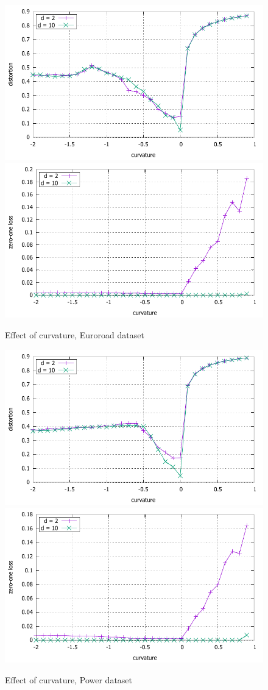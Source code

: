 \documentclass{article} %
\begin{document}
\begin{figure}
    \centering
    \includegraphics[width = 0.49 \textwidth]{euroroad_distortion.pdf}
    \includegraphics[width = 0.49 \textwidth]{euroroad_zero_one.pdf}
    \caption{Effect of curvature, Euroroad dataset}
    \label{fig:euroroad}
\end{figure}

\begin{figure}
    \centering
    \includegraphics[width = 0.49 \textwidth]{power_distortion.pdf}
    \includegraphics[width = 0.49 \textwidth]{power_zero_one.pdf}
    \caption{Effect of curvature, Power dataset}
    \label{fig:power}
\end{figure}
\end{document}
